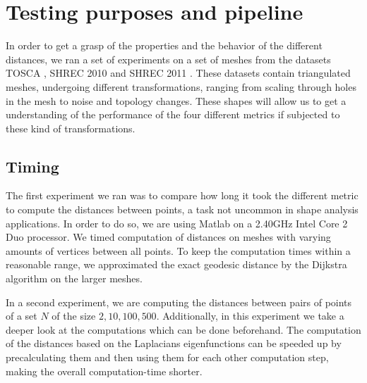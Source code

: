 \chapter{Testing purposes and pipeline}
\label{chapter:testing}


In order to get a grasp of the properties and the behavior of the different distances, we ran a set of experiments on a set of meshes from the datasets TOSCA \cite{bronstein2008numerical}, SHREC 2010 \cite{bronstein2010shrec} and SHREC 2011 \cite{dutagaci2011shrec}.
These datasets contain triangulated meshes, undergoing different transformations, ranging from scaling through holes in the mesh to noise and topology changes.
These shapes will allow us to get a understanding of the performance of the four different metrics if subjected to these kind of transformations.

\section{Timing}

The first experiment we ran was to compare how long it took the different metric to compute the distances between points, a task not uncommon in shape analysis applications.
In order to do so, we are using Matlab on a 2.40GHz Intel Core 2 Duo processor.
We timed computation of distances on meshes with varying amounts of vertices between all points.
To keep the computation times within a reasonable range, we approximated the exact geodesic distance by the Dijkstra algorithm on the larger meshes.

In a second experiment, we are computing the distances between pairs of points of a set $N$ of the size $2,10,100,500$.
Additionally, in this experiment we take a deeper look at the computations which can be done beforehand.
The computation of the distances based on the Laplacians eigenfunctions can be speeded up by precalculating them and then using them for each other computation step, making the overall computation-time shorter.

